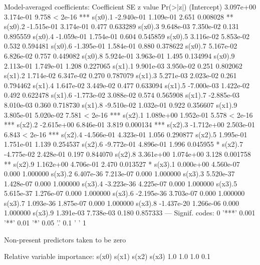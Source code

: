 \documentclass{article}
\begin{document}
\begin{Schunk}
\begin{Soutput}
Model-averaged coefficients:
            Coefficient         SE z value Pr(>|z|)    
(Intercept)   3.097e+00  3.174e-01   9.758  < 2e-16 ***
s(x0).1      -2.940e-01  1.109e-01   2.651 0.008028 ** 
s(x0).2      -1.515e-01  3.174e-01   0.477 0.633289    
s(x0).3       9.648e-03  7.350e-02   0.131 0.895559    
s(x0).4      -1.059e-01  1.754e-01   0.604 0.545859    
s(x0).5       3.116e-02  5.853e-02   0.532 0.594481    
s(x0).6      -1.395e-01  1.584e-01   0.880 0.378622    
s(x0).7       5.167e-02  6.826e-02   0.757 0.449082    
s(x0).8       5.924e-01  3.963e-01   1.495 0.134994    
s(x0).9       2.113e-01  1.749e-01   1.208 0.227065    
s(x1).1       9.901e-03  3.950e-02   0.251 0.802062    
s(x1).2       1.714e-02  6.347e-02   0.270 0.787079    
s(x1).3       5.271e-03  2.023e-02   0.261 0.794462    
s(x1).4       1.647e-02  3.449e-02   0.477 0.633094    
s(x1).5      -7.000e-03  1.422e-02   0.492 0.622478    
s(x1).6      -1.773e-02  3.088e-02   0.574 0.565908    
s(x1).7      -2.885e-03  8.010e-03   0.360 0.718730    
s(x1).8      -9.510e-02  1.032e-01   0.922 0.356607    
s(x1).9       3.805e-01  5.020e-02   7.581  < 2e-16 ***
s(x2).1       1.089e+00  1.952e-01   5.578  < 2e-16 ***
s(x2).2      -2.615e+00  6.846e-01   3.819 0.000134 ***
s(x2).3      -1.712e+00  2.503e-01   6.843  < 2e-16 ***
s(x2).4      -4.566e-01  4.323e-01   1.056 0.290877    
s(x2).5       1.995e-01  1.751e-01   1.139 0.254537    
s(x2).6      -9.772e-01  4.896e-01   1.996 0.045955 *  
s(x2).7      -4.775e-02  2.428e-01   0.197 0.844070    
s(x2).8       3.361e+00  1.074e+00   3.128 0.001758 ** 
s(x2).9       1.162e+00  4.706e-01   2.470 0.013527 *  
s(x3).1       0.000e+00  4.560e-07   0.000 1.000000    
s(x3).2       6.407e-36  7.213e-07   0.000 1.000000    
s(x3).3       5.520e-37  1.428e-07   0.000 1.000000    
s(x3).4      -3.223e-36  4.225e-07   0.000 1.000000    
s(x3).5       5.615e-37  1.276e-07   0.000 1.000000    
s(x3).6      -2.195e-36  3.703e-07   0.000 1.000000    
s(x3).7       1.093e-36  1.875e-07   0.000 1.000000    
s(x3).8      -1.437e-20  1.266e-06   0.000 1.000000    
s(x3).9       1.391e-03  7.738e-03   0.180 0.857333    
---
Signif. codes:  0 '***' 0.001 '**' 0.01 '*' 0.05 '.' 0.1 ' ' 1 

Non-present predictors taken to be zero 

Relative variable importance:
s(x0) s(x1) s(x2) s(x3) 
  1.0   1.0   1.0   0.1 
\end{Soutput}
\end{Schunk}
\end{document}
